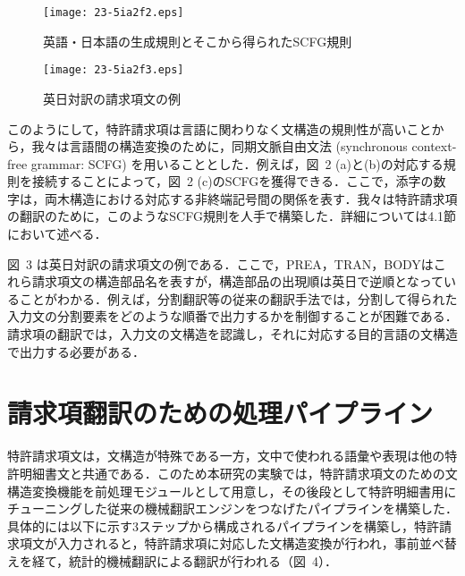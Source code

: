 \documentclass[japanese]{jnlp_1.4}
\begin{document}
\begin{figure}[b]
\begin{center}
\texttt{[image: 23-5ia2f2.eps]}
\end{center}
\caption{英語・日本語の生成規則とそこから得られたSCFG規則}
\label{fig02}
\end{figure}
\begin{figure}[b]
\begin{center}
\texttt{[image: 23-5ia2f3.eps]}
\end{center}
\caption{英日対訳の請求項文の例}
\label{fig03}
\end{figure}

このようにして，特許請求項は言語に関わりなく文構造の規則性が高いことから，我々は言語間の構造変換のために，同期文脈自由文法 (synchronous 
context-free grammar: 
SCFG) を用いることとした．例えば，図~2 (a)と(b)の対応する規則を接続することによって，図~2 (c)のSCFGを獲得できる．ここで，添字の数字は，両木構造における対応する非終端記号間の関係を表す．我々は特許請求項の翻訳のために，このようなSCFG規則を人手で構築した．詳細については4.1節において述べる．

図~3 は英日対訳の請求項文の例である．ここで，PREA，TRAN，BODYはこれら請求項文の構造部品名を表すが，構造部品の出現順は英日で逆順となっていることがわかる．例えば，分割翻訳等の従来の翻訳手法では，分割して得られた入力文の分割要素をどのような順番で出力するかを制御することが困難である．請求項の翻訳では，入力文の文構造を認識し，それに対応する目的言語の文構造で出力する必要がある．


\section{請求項翻訳のための処理パイプライン}

特許請求項文は，文構造が特殊である一方，文中で使われる語彙や表現は他の特許明細書文と共通である．このため本研究の実験では，特許請求項文のための文構造変換機能を前処理モジュールとして用意し，その後段として特許明細書用にチューニングした従来の機械翻訳エンジンをつなげたパイプラインを構築した．具体的には以下に示す3ステップから構成されるパイプラインを構築し，特許請求項文が入力されると，特許請求項に対応した文構造変換が行われ，事前並べ替えを経て，統計的機械翻訳による翻訳が行われる（図~4）．
\end{document}
